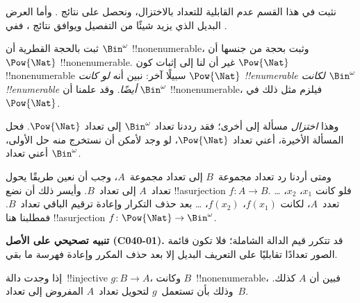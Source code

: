 \documentclass[../../../include/open-logic-section]{subfiles}
\begin{document}


\begin{editorial}
نثبت في هذا القسم عدم القابلية للتعداد بالاختزال، ونحصل على نتائج . وأما العرض البديل الذي يزيد شيئًا من التفصيل ويوافق نتائج ، ففي .
\end{editorial}

ثبت بالحجة القطرية أن $\Bin^\omega$ !!{nonenumerable}، وثبت بحجة من جنسها أن $\Pow{\Nat}$ !!{nonenumerable}. غير أن لنا إلى إثبات كون $\Pow{\Nat}$ !!{nonenumerable} سبيلًا آخر: نبين أنه \emph{لو كانت $\Pow{\Nat}$ !!{enumerable} لكانت $\Bin^\omega$ !!{enumerable} أيضًا}. وقد علمنا أن $\Bin^\omega$ !!{nonenumerable}، فيلزم مثل ذلك في $\Pow{\Nat}$.

وهذا \emph{اختزال} مسألة إلى أخرى؛ فقد رددنا تعداد $\Bin^\omega$ إلى تعداد $\Pow{\Nat}$. فحل المسألة الأخيرة، أعني تعداد $\Pow{\Nat}$، لو وجد لأمكن أن نستخرج منه حل الأولى، أعني تعداد $\Bin^\omega$.

ومتى أردنا رد تعداد مجموعة~$B$ إلى تعداد مجموعة~$A$، وجب أن نعين طريقًا يحول تعداد~$A$ إلى تعداد~$B$. وأيسر ذلك أن نضع !!a{surjection} $f\colon A \to B$. فلو كانت $x_1$، $x_2$، \dots{} تعدد~$A$، لكانت $f(x_1)$، $f(x_2)$، \dots{} بعد حذف التكرار وإعادة ترقيم الباقي تعداد~$B$. فمطلبنا هنا !!a{surjection} $f\colon \Pow{\Nat}
\to \Bin^\omega$.

\textbf{تنبيه تصحيحي على الأصل (C040-01).} قد تتكرر قيم الدالة الشاملة؛ فلا تكون
قائمة الصور تعدادًا تقابليًا على التعريف البديل إلا بعد حذف المكرر وإعادة
فهرسة ما بقي.

\begin{prob}
إذا وجدت دالة~!!{injective} $g\colon B \to A$، وكانت $B$~!!{nonenumerable}، فبين أن $A$ كذلك. وذلك بأن تستعمل~$g$ لتحويل تعداد~$A$ المفروض إلى تعداد~$B$.
\end{prob}
\end{document}
